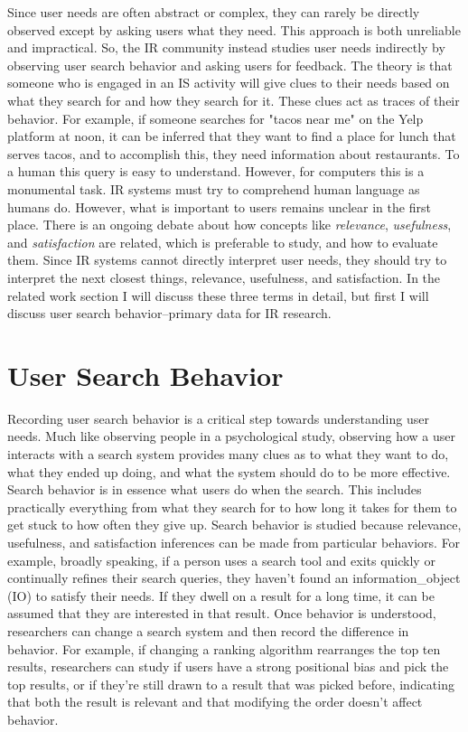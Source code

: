 Since user needs are often abstract or complex, they can rarely be directly observed except by asking users what they need. This approach is both unreliable and impractical. So, the IR community instead studies user needs indirectly by observing user search behavior and asking users for feedback. The theory is that someone who is engaged in an IS activity will give clues to their needs based on what they search for and how they search for it. These clues act as traces of their behavior. For example, if someone searches for "tacos near me" on the Yelp platform at noon, it can be inferred that they want to find a place for lunch that serves tacos, and to accomplish this, they need information about restaurants. To a human this query is easy to understand. However, for computers this is a monumental task. IR systems must try to comprehend human language as humans do. However, what is important to users remains unclear in the first place. There is an ongoing debate about how concepts like \emph{relevance}, \emph{usefulness}, and \emph{satisfaction} are related, which is preferable to study, and how to evaluate them. Since IR systems cannot directly interpret user needs, they should try to interpret the next closest things, relevance, usefulness, and satisfaction. In the related work section I will discuss these three terms in detail, but first I will discuss user search behavior–primary data for IR research.

\section{User Search Behavior}

Recording user search behavior is a critical step towards understanding user needs. Much like observing people in a psychological study, observing how a user interacts with a search system provides many clues as to what they want to do, what they ended up doing, and what the system should do to be more effective. Search behavior is in essence what users do when the search. This includes practically everything from what they search for to how long it takes for them to get stuck to how often they give up. Search behavior is studied because relevance, usefulness, and satisfaction inferences can be made from particular behaviors. For example, broadly speaking, if a person uses a search tool and exits quickly or continually refines their search queries, they haven't found an \gls{information_object} (\acrshort{IO}) to satisfy their needs. If they dwell on a result for a long time, it can be assumed that they are interested in that result. Once behavior is understood, researchers can change a search system and then record the difference in behavior. For example, if changing a ranking algorithm rearranges the top ten results, researchers can study if users have a strong positional bias and pick the top results, or if they're still drawn to a result that was picked before, indicating that both the result is relevant and that modifying the order doesn't affect behavior.


